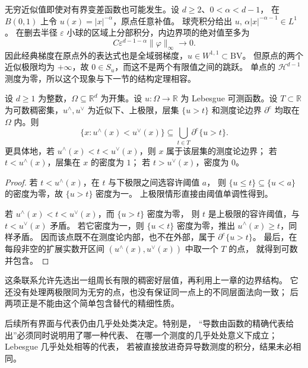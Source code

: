 \ProseParagraphBreak

无穷近似值即使对有界变差函数也可能发生。设 \(d\ge2\)、\(0<\alpha<d-1\)，
在 \(B(0,1)\) 上令 \(u(x)=|x|^{-\alpha}\)，原点任意补值。
球壳积分给出 \(u,\,\alpha|x|^{-\alpha-1}\in L^1\)。
在删去半径 \(\varepsilon\) 小球的区域上分部积分，内边界项的绝对值至多为
\[
 C\varepsilon^{d-1-\alpha}\|\varphi\|_\infty\longrightarrow0.
\]
因此经典梯度在原点外的表达式也是全域弱梯度，\(u\in W^{1,1}\subset \mathrm{BV}\)。
但原点的两个近似极限均为 \(+\infty\)，故 \(0\in S_u\)，而这不是两个有限值之间的跳跃。
单点的 \(\mathcal H^{d-1}\) 测度为零，所以这个现象与下一节的结构定理相容。

\begin{proposition}[近似振荡与层集边界]\label{b1:prop:approximate-oscillation-level-boundary}
设 \(d\ge1\) 为整数，\(\Omega\subseteq\mathbb R^d\) 为开集。设 \(u:\Omega\to\mathbb R\) 为 Lebesgue 可测函数。设 \(T\subset\mathbb R\) 为可数稠密集，\(u^\wedge,u^\vee\) 为近似下、上极限，层集 \(\{u>t\}\) 和测度论边界 \(\partial^e\) 均取在 \(\Omega\) 内。则
\[
 \{x:u^\wedge(x)<u^\vee(x)\}
 \subseteq\bigcup_{t\in T}\partial^e\{u>t\}.
\]
更具体地，若 \(u^\wedge(x)<t<u^\vee(x)\)，则 \(x\) 属于该层集的测度论边界；
若 \(t<u^\wedge(x)\)，层集在 \(x\) 的密度为 \(1\)；
若 \(t>u^\vee(x)\)，密度为 \(0\)。
\end{proposition}
\begin{proof}
若 \(t<u^\wedge(x)\)，在 \(t\) 与下极限之间选容许阈值 \(a\)，
则 \(\{u\le t\}\subseteq\{u<a\}\) 的密度为零，故 \(\{u>t\}\) 密度为一。
上极限情形直接由阈值单调性得到。

若 \(u^\wedge(x)<t<u^\vee(x)\)，而 \(\{u>t\}\) 密度为零，
则 \(t\) 是上极限的容许阈值，与 \(t<u^\vee(x)\) 矛盾。
若它密度为一，则 \(\{u<t\}\) 密度为零，推出 \(u^\wedge(x)\ge t\)，同样矛盾。
因而该点既不在测度论内部，也不在外部，属于 \(\partial^e\{u>t\}\)。
最后，在每段非空的扩展实数开区间 \((u^\wedge(x),u^\vee(x))\) 中取一个 \(T\) 的点，
就得到可数并包含。
\end{proof}

这条联系允许先选出一组周长有限的稠密好层值，再利用上一章的边界结构。
它还没有处理两极限同为无穷的点，也没有保证同一点上的不同层面法向一致；
后两项正是不能由这个简单包含替代的精细性质。

\ProseParagraphBreak

后续所有界面与代表仍由几乎处处类决定。特别是，
“导数由函数的精确代表给出”必须同时说明用了哪一种代表、
在哪一个测度的几乎处处意义下成立；Lebesgue 几乎处处相等的代表，
若被直接放进奇异导数测度的积分，结果未必相同。
